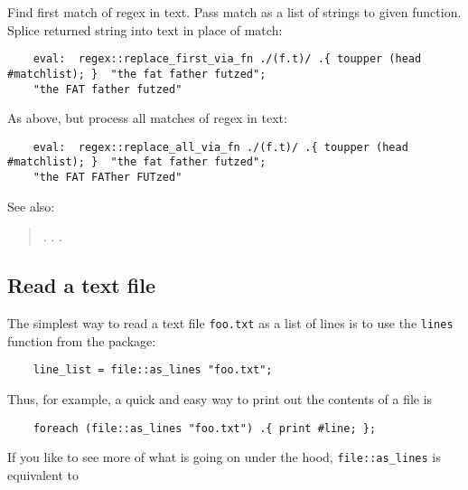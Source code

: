 Find first match of regex in text. 
Pass match as a list of strings to given function. 
Splice returned string into text in place of match:
\begin{verbatim}
    eval:  regex::replace_first_via_fn ./(f.t)/ .{ toupper (head #matchlist); }  "the fat father futzed";
    "the FAT father futzed"
\end{verbatim}

As above, but process all matches of regex in text:
\begin{verbatim}
    eval:  regex::replace_all_via_fn ./(f.t)/ .{ toupper (head #matchlist); }  "the fat father futzed";
    "the FAT FATher FUTzed"
\end{verbatim}

See also:
\begin{quotation}
.\newline 
{}.\newline 
{}.\newline
{}\newline
\end{quotation}
\cutend*


\subsection{Read a text file}

The simplest way to read a text file {\tt foo.txt} as a list of lines is 
to use the {\tt lines} function from the 
 package:

\begin{verbatim}
    line_list = file::as_lines "foo.txt";
\end{verbatim}

Thus, for example, a quick and easy way to print out the contents of a file is

\begin{verbatim}
    foreach (file::as_lines "foo.txt") .{ print #line; };
\end{verbatim}

If you like to see more of what is going on under the hood, {\tt file::as_lines} 
is equivalent to

